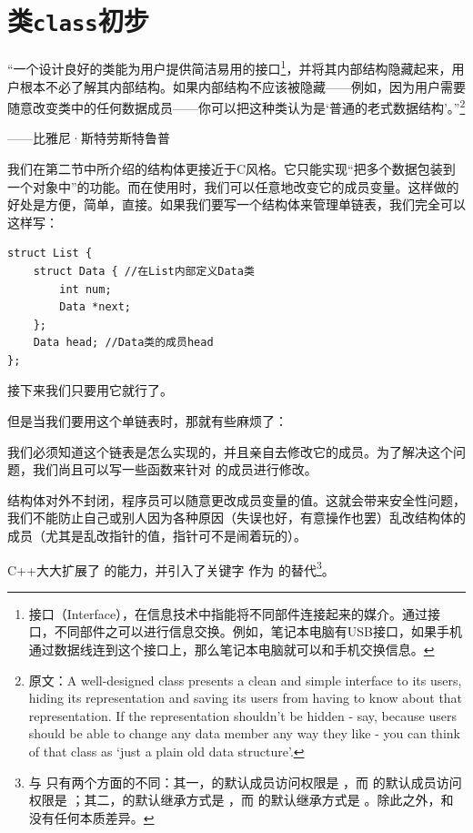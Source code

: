 \section{类\texttt{class}初步}
{\kaishu\large ``一个设计良好的类能为用户提供简洁易用的接口\footnote{接口（Interface），在信息技术中指能将不同部件连接起来的媒介。通过接口，不同部件之可以进行信息交换。例如，笔记本电脑有USB接口，如果手机通过数据线连到这个接口上，那么笔记本电脑就可以和手机交换信息。}，并将其内部结构隐藏起来，用户根本不必了解其内部结构。如果内部结构不应该被隐藏——例如，因为用户需要随意改变类中的任何数据成员——你可以把这种类认为是`普通的老式数据结构'。''\footnote{原文：A well-designed class presents a clean and simple interface to its users, hiding its representation and saving its users from having to know about that representation. If the representation shouldn't be hidden - say, because users should be able to change any data member any way they like - you can think of that class as `just a plain old data structure'.}}
\begin{flushright}——比雅尼·斯特劳斯特鲁普\end{flushright}\par
我们在第二节中所介绍的结构体更接近于C风格。它只能实现``把多个数据包装到一个对象中''的功能。而在使用时，我们可以任意地改变它的成员变量。这样做的好处是方便，简单，直接。如果我们要写一个结构体来管理单链表，我们完全可以这样写：
\begin{lstlisting}
struct List {
    struct Data { //在List内部定义Data类
        int num;
        Data *next;
    };
    Data head; //Data类的成员head
};
\end{lstlisting}
接下来我们只要用它就行了。\par
但是当我们要用这个单链表时，那就有些麻烦了：\par
我们必须知道这个链表是怎么实现的，并且亲自去修改它的成员。为了解决这个问题，我们尚且可以写一些函数来针对 \lstinline@struct@ 的成员进行修改。\par
结构体对外不封闭，程序员可以随意更改成员变量的值。这就会带来安全性问题，我们不能防止自己或别人因为各种原因（失误也好，有意操作也罢）乱改结构体的成员（尤其是乱改指针的值，指针可不是闹着玩的）。\par
C++大大扩展了 \lstinline@struct@ 的能力，并引入了关键字 \lstinline@class@ 作为 \lstinline@struct@ 的替代\footnote{\lstinline@class@ 与 \lstinline@struct@ 只有两个方面的不同：其一，\lstinline@class@ 的默认成员访问权限是 \lstinline@private@，而 \lstinline@struct@ 的默认成员访问权限是 \lstinline@public@；其二，\lstinline@class@ 的默认继承方式是 \lstinline@private@，而 \lstinline@struct@ 的默认继承方式是 \lstinline@public@。除此之外，\lstinline@class@ 和 \lstinline@struct@ 没有任何本质差异。}。\par
